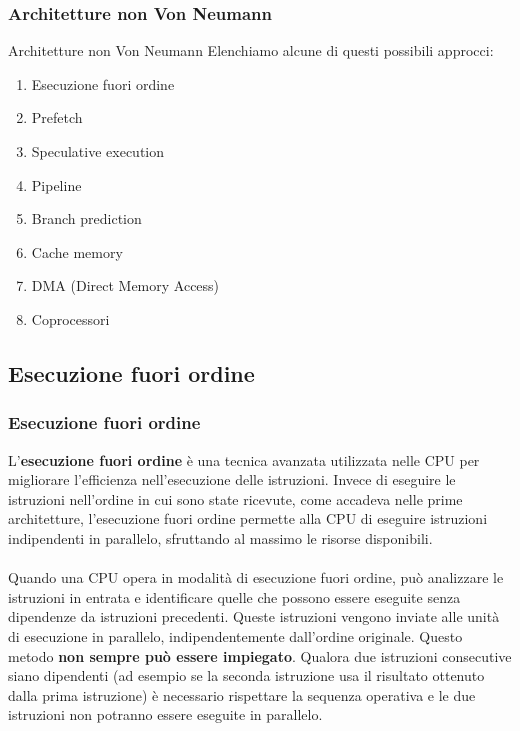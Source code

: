\begin{frame}
	\frametitle{Architetture non Von Neumann}

	\begin{block}{Architetture non Von Neumann}
		Elenchiamo alcune di questi possibili approcci:
		\begin{enumerate}
			\item Esecuzione fuori ordine
			\item Prefetch
			\item Speculative execution
			\item Pipeline
			\item Branch prediction
			\item Cache memory
			\item DMA (Direct Memory Access)
			\item Coprocessori
		\end{enumerate}
	\end{block}

\end{frame}


\subsection[Esecuzione fuori ordine]{Esecuzione fuori ordine}
\begin{frame}
	\frametitle{ Esecuzione fuori ordine}

		L'\textbf{esecuzione fuori ordine} è una tecnica avanzata utilizzata nelle CPU per migliorare l'efficienza nell'esecuzione delle istruzioni. Invece di eseguire le istruzioni nell'ordine in cui sono state ricevute, come accadeva nelle prime architetture, l'esecuzione fuori ordine permette alla CPU di eseguire istruzioni indipendenti in parallelo, sfruttando al massimo le risorse disponibili.\\~\\		
		Quando una CPU opera in modalità di esecuzione fuori ordine, può analizzare le istruzioni in entrata e identificare quelle che possono essere eseguite senza dipendenze da istruzioni precedenti. Queste istruzioni vengono inviate alle unità di esecuzione in parallelo, indipendentemente dall'ordine originale. Questo metodo \textbf{non sempre può essere impiegato}. Qualora due istruzioni consecutive siano dipendenti (ad esempio se la seconda istruzione usa il risultato ottenuto dalla prima istruzione) è necessario rispettare la sequenza operativa e le due istruzioni non potranno essere eseguite in parallelo.

\end{frame}


